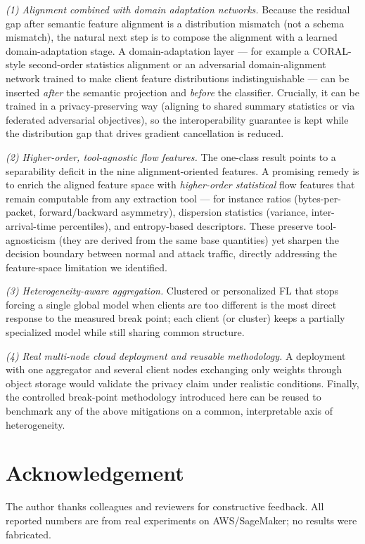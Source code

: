 \documentclass[11pt,a4paper]{article}
\begin{document}
\emph{(1) Alignment combined with domain adaptation networks.}
Because the residual gap after semantic feature alignment is a distribution
mismatch (not a schema mismatch), the natural next step is to compose the
alignment with a learned domain-adaptation stage. A domain-adaptation layer ---
for example a CORAL-style second-order statistics alignment or an adversarial
domain-alignment network trained to make client feature distributions
indistinguishable --- can be inserted \emph{after} the semantic projection and
\emph{before} the classifier. Crucially, it can be trained in a privacy-preserving
way (aligning to shared summary statistics or via federated adversarial
objectives), so the interoperability guarantee is kept while the distribution gap
that drives gradient cancellation is reduced.

\emph{(2) Higher-order, tool-agnostic flow features.} The one-class result points
to a separability deficit in the nine alignment-oriented features. A promising
remedy is to enrich the aligned feature space with \emph{higher-order statistical}
flow
features that remain computable from any extraction tool --- for instance ratios
(bytes-per-packet, forward/backward asymmetry), dispersion statistics (variance,
inter-arrival-time percentiles), and entropy-based descriptors. These preserve
tool-agnosticism (they are derived from the same base quantities) yet sharpen the
decision boundary between normal and attack traffic, directly addressing the
feature-space limitation we identified.

\emph{(3) Heterogeneity-aware aggregation.} Clustered or personalized FL that
stops forcing a single global model when clients are too different is the most
direct response to the measured break point; each client (or cluster) keeps a
partially specialized model while still sharing common structure.

\emph{(4) Real multi-node cloud deployment and reusable methodology.} A deployment
with one aggregator and several client nodes exchanging only weights through object
storage would validate the privacy claim under realistic conditions. Finally, the
controlled break-point methodology introduced here can be reused to benchmark any
of the above mitigations on a common, interpretable axis of heterogeneity.

\section*{Acknowledgement}
The author thanks colleagues and reviewers for constructive feedback. All
reported numbers are from real experiments on AWS/SageMaker; no results were
fabricated.
\end{document}

